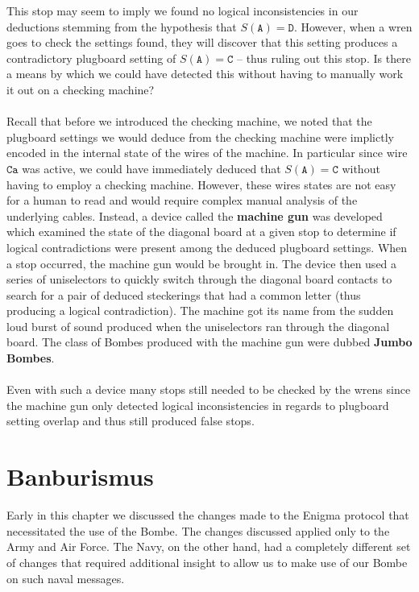 This stop may seem to imply we found no logical inconsistencies in our
deductions stemming from the hypothesis that $S(\texttt{A}) =
\texttt{D}$. However, when a wren goes to check the settings found,
they will discover that this setting produces a contradictory
plugboard setting of $S(\texttt{A}) = \texttt{C}$ -- thus ruling out
this stop. Is there a means by which we could have detected this
without having to manually work it out on a checking machine?
\\\\Recall that before we introduced the checking machine, we noted
that the plugboard settings we would deduce from the checking machine
were implictly encoded in the internal state of the wires of the
machine. In particular since wire $\texttt{Ca}$ was active, we could
have immediately deduced that $S(\texttt{A})= \texttt{C}$ without
having to employ a checking machine. However, these wires states are
not easy for a human to read and would require complex manual
analysis of the underlying cables. Instead, a device called the
{\bf{machine gun}} was developed which examined the state of the
diagonal board at a given stop to determine if logical contradictions
were present among the deduced plugboard settings. When a stop
occurred, the machine gun would be brought in. The device then used a
series of uniselectors to quickly switch through the diagonal board
contacts to search for a pair of deduced steckerings that had a
common letter (thus producing a logical contradiction). The machine
got its name from the sudden loud burst of sound produced when the
uniselectors ran through the diagonal board. The class of Bombes
produced with the machine gun were dubbed {\bf{Jumbo Bombes}}.
\\\\Even with such a device many stops still needed to be checked by
the wrens since the machine gun only detected logical inconsistencies
in regards to plugboard setting overlap and thus still produced false stops.

\section{Banburismus}
Early in this chapter we discussed the changes made to the Enigma
protocol that necessitated the use of the Bombe. The changes
discussed applied only to the Army and Air Force. The Navy, on the
other hand, had a completely different set of changes that required
additional insight to allow us to make use of our Bombe on such naval messages.

